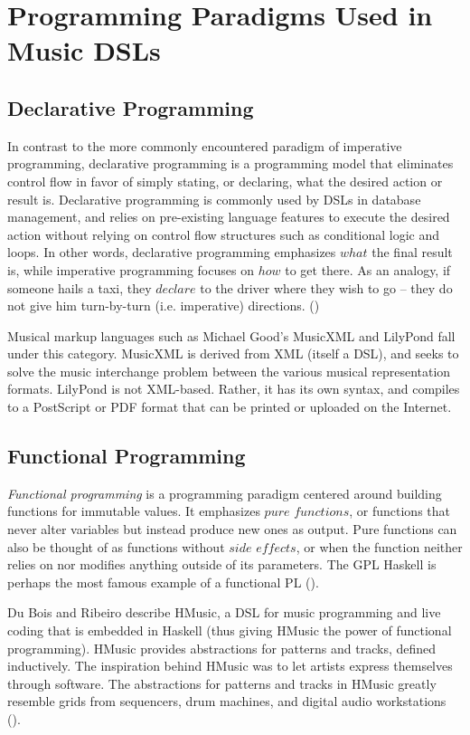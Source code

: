 \documentclass{report}
\newcommand\citeparen[1]{(\cite{#1})}
\begin{document}
\section{Programming Paradigms Used  in Music  DSLs}
\label{sec:prog_paradigms}

\subsection{Declarative Programming}
In contrast to the more commonly encountered paradigm of imperative programming, declarative programming is a programming model that eliminates control flow in favor of simply stating, or declaring, what the desired action or result is. Declarative programming is commonly used by DSLs in database management, and relies on pre-existing language features to execute the desired action without relying on control flow structures such as conditional logic and loops. In other words, declarative programming emphasizes $what$ the final result is, while imperative programming focuses on $how$ to get there. As an analogy, if someone hails a taxi, they $declare$ to the driver where they wish to go -- they do not give him turn-by-turn (i.e. imperative) directions. \citeparen{bertram_2021}

Musical markup languages such as Michael Good's MusicXML and LilyPond fall under this category. MusicXML is derived from XML (itself a DSL), and seeks to solve the music interchange problem between the various musical representation formats.  \cite{good_2013} LilyPond is not XML-based. Rather, it has its own syntax, and compiles to a PostScript or PDF format that can be printed or uploaded on the Internet.

\subsection{Functional Programming}
\textit{Functional programming} is a programming paradigm centered around  building functions for immutable values. It emphasizes $pure$ $functions$, or functions that never alter variables  but instead produce new  ones as output. Pure functions  can also be thought of as functions without $side$ $effects$, or when the function neither relies on nor modifies anything outside of its parameters. The GPL Haskell is perhaps the most famous example of a functional PL \citeparen{joury_2020}.

Du Bois and Ribeiro describe HMusic, a DSL for music programming and live coding that is embedded in Haskell (thus giving HMusic the power  of functional programming). HMusic provides abstractions for patterns and tracks, defined inductively. The inspiration behind HMusic was to let artists express  themselves through software. The abstractions for patterns and  tracks in HMusic greatly resemble grids from sequencers, drum  machines, and digital audio workstations \citeparen{bois_ribeiro_1970}.
\end{document}
